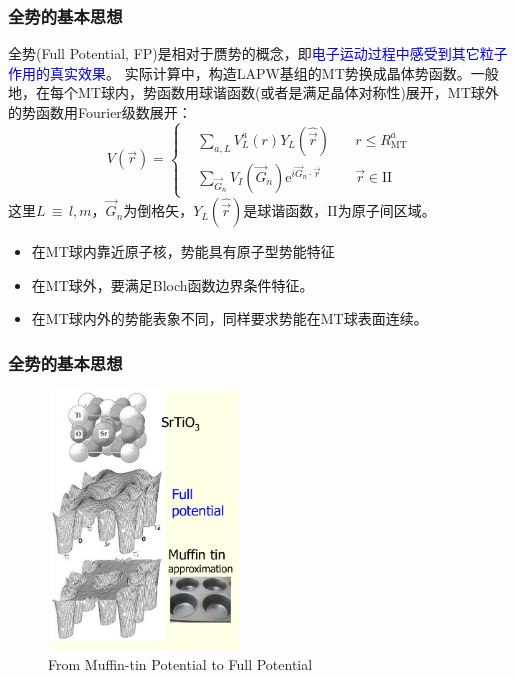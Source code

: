 \frame
{
\frametitle{全势的基本思想}
全势\textrm{(Full Potential, FP)}是相对于赝势的概念，即\textcolor{blue}{电子运动过程中感受到其它粒子作用的真实效果}。
实际计算中，构造\textrm{LAPW}基组的\textrm{MT}势换成晶体势函数。一般地，在每个\textrm{MT}球内，势函数用球谐函数(或者是满足晶体对称性)展开，\textrm{MT}球外的势函数用\textrm{Fourier}级数展开：%
{\footnotesize$$ V(\vec r)=\left\{
  \begin{aligned}
    &\sum_{a,L}V_L^a(r)Y_L(\hat{\vec r})\quad &r\leqslant R_{\mathrm{MT}}^a\\
    &\sum_{\vec G_n}V_I(\vec G_n)\textrm{e}^{i\vec G_n\cdot\vec r} &\vec r\in\mathrm{II}
  \end{aligned}\right.
  \label{eq:solid-63}
$$}
这里$L$\,$\equiv$\,$l,m$，$\vec G_n$为倒格矢，$Y_L(\hat{\vec r})$是球谐函数，\textrm{II}为原子间区域。
\begin{itemize}
	\item 在\textrm{MT}球内靠近原子核，势能具有原子型势能特征
	\item 在\textrm{MT}球外，要满足\textrm{Bloch}函数边界条件特征。
	\item 在\textrm{MT}球内外的势能表象不同，同样要求势能在\textrm{MT}球表面连续。
\end{itemize}
}

\frame
{
\frametitle{全势的基本思想}
\vspace*{-13pt}
\begin{figure}[h!]
\centering
\includegraphics[height=2.70in,width=2.02in,viewport=1 22 507 715,clip]{Figures/MT_FP.png}
\caption{\small \textrm{From Muffin-tin Potential to Full Potential}}%
\label{Muffin_tin_LO}
\end{figure}
}

